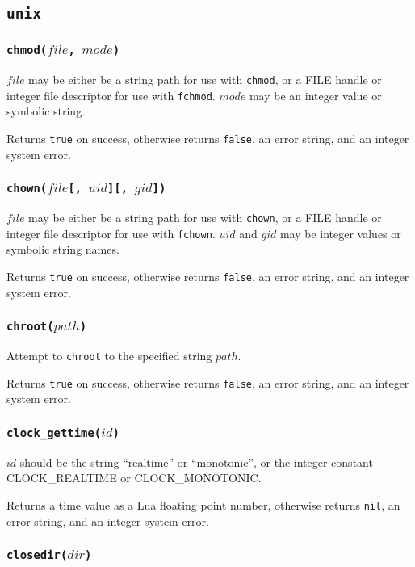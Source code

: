 \documentclass[11pt, oneside]{memoir}
\newcommand*{\true}[0]{\texttt{true}\xspace}
\newcommand*{\false}[0]{\texttt{false}\xspace}
\newcommand*{\nil}[0]{\texttt{nil}\xspace}
\newcommand*{\syscall}[1]{\texttt{#1}\xspace}
\newcommand*{\fn}[1]{\texttt{#1}\xspace}
\newcounter{toccols}
\newenvironment{Module}[1]{
	\subsection{\texttt{#1}}
	\addtocontents{toc}{
		\protect\begin{multicols}{\value{toccols}}
	}
}{
	\addtocontents{toc}{\protect\end{multicols}}
}
\begin{document}
\begin{Module}{unix}
\subsubsection[\fn{chmod}]{\fn{chmod($file$, $mode$)}}

$file$ may be either be a string path for use with \syscall{chmod}, or a FILE handle or integer file descriptor for use with \syscall{fchmod}. $mode$ may be an integer value or symbolic string.

Returns \true on success, otherwise returns \false, an error string, and an integer system error.

\subsubsection[\fn{chown}]{\fn{chown($file$[, $uid$][, $gid$])}}

$file$ may be either be a string path for use with \syscall{chown}, or a FILE handle or integer file descriptor for use with \syscall{fchown}. $uid$ and $gid$ may be integer values or symbolic string names.

Returns \true on success, otherwise returns \false, an error string, and an integer system error.

\subsubsection[\fn{chroot}]{\fn{chroot($path$)}}

Attempt to \syscall{chroot} to the specified string $path$.

Returns \true on success, otherwise returns \false, an error string, and an integer system error.

\subsubsection[\fn{clock\_gettime}]{\fn{clock\_gettime($id$)}}

$id$ should be the string ``realtime'' or ``monotonic'', or the integer constant CLOCK\_REALTIME or CLOCK\_MONOTONIC.

Returns a time value as a Lua floating point number, otherwise returns \nil, an error string, and an integer system error.

\subsubsection[\fn{closedir}]{\fn{closedir($dir$)}}


\end{Module}
\end{document}
